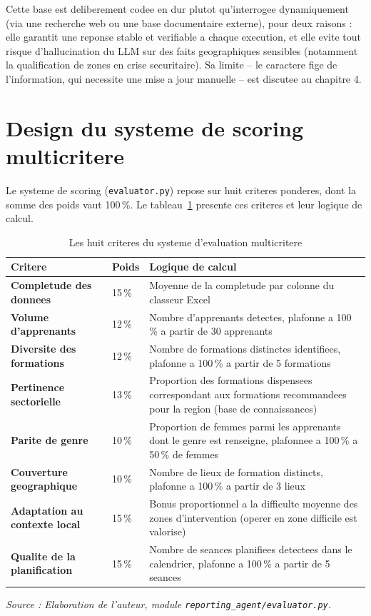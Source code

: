 \documentclass[12pt,a4paper,twoside,openany]{report}
\begin{document}
Cette base est deliberement codee en dur plutot qu'interrogee dynamiquement (via une recherche web ou une base documentaire externe), pour deux raisons : elle garantit une reponse stable et verifiable a chaque execution, et elle evite tout risque d'hallucination du LLM sur des faits geographiques sensibles (notamment la qualification de zones en crise securitaire). Sa limite -- le caractere fige de l'information, qui necessite une mise a jour manuelle -- est discutee au chapitre 4.

\section{Design du systeme de scoring multicritere}
\label{sec:criteres}

Le systeme de scoring (\texttt{evaluator.py}) repose sur huit criteres ponderes, dont la somme des poids vaut 100\,\%. Le tableau~\ref{tab:criteres_design} presente ces criteres et leur logique de calcul.

\begin{table}[H]
\centering
\caption{Les huit criteres du systeme d'evaluation multicritere}
\label{tab:criteres_design}
\begin{tabularx}{\textwidth}{>{\bfseries}l l X}
\toprule
Critere & Poids & Logique de calcul \\
\midrule
Completude des donnees & 15\,\% & Moyenne de la completude par colonne du classeur Excel \\
Volume d'apprenants & 12\,\% & Nombre d'apprenants detectes, plafonne a 100\,\% a partir de 30 apprenants \\
Diversite des formations & 12\,\% & Nombre de formations distinctes identifiees, plafonne a 100\,\% a partir de 5 formations \\
Pertinence sectorielle & 13\,\% & Proportion des formations dispensees correspondant aux formations recommandees pour la region (base de connaissances) \\
Parite de genre & 10\,\% & Proportion de femmes parmi les apprenants dont le genre est renseigne, plafonnee a 100\,\% a 50\,\% de femmes \\
Couverture geographique & 10\,\% & Nombre de lieux de formation distincts, plafonne a 100\,\% a partir de 3 lieux \\
Adaptation au contexte local & 15\,\% & Bonus proportionnel a la difficulte moyenne des zones d'intervention (operer en zone difficile est valorise) \\
Qualite de la planification & 15\,\% & Nombre de seances planifiees detectees dans le calendrier, plafonne a 100\,\% a partir de 5 seances \\
\bottomrule
\end{tabularx}
\textit{Source : Elaboration de l'auteur, module \texttt{reporting\_agent/evaluator.py}.}
\end{table}
\end{document}
